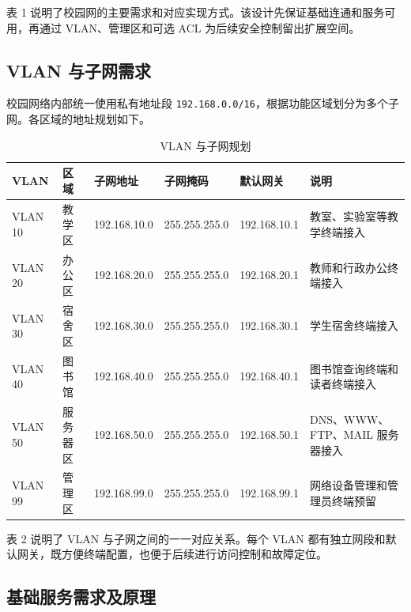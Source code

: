 \documentclass[UTF8,a4paper]{ctexart}
\begin{document}
表 1 说明了校园网的主要需求和对应实现方式。该设计先保证基础连通和服务可用，再通过 VLAN、管理区和可选 ACL 为后续安全控制留出扩展空间。

\subsection{VLAN 与子网需求}

校园网络内部统一使用私有地址段 \texttt{192.168.0.0/16}，根据功能区域划分为多个子网。各区域的地址规划如下。

\begin{table}[H]
\centering
\caption{VLAN 与子网规划}
\begin{tabularx}{\textwidth}{p{1.7cm}p{1.8cm}p{2.5cm}p{2.5cm}p{2.4cm}Y}
\toprule
VLAN & 区域 & 子网地址 & 子网掩码 & 默认网关 & 说明 \\
\midrule
VLAN 10 & 教学区 & 192.168.10.0 & 255.255.255.0 & 192.168.10.1 & 教室、实验室等教学终端接入 \\
VLAN 20 & 办公区 & 192.168.20.0 & 255.255.255.0 & 192.168.20.1 & 教师和行政办公终端接入 \\
VLAN 30 & 宿舍区 & 192.168.30.0 & 255.255.255.0 & 192.168.30.1 & 学生宿舍终端接入 \\
VLAN 40 & 图书馆 & 192.168.40.0 & 255.255.255.0 & 192.168.40.1 & 图书馆查询终端和读者终端接入 \\
VLAN 50 & 服务器区 & 192.168.50.0 & 255.255.255.0 & 192.168.50.1 & DNS、WWW、FTP、MAIL 服务器接入 \\
VLAN 99 & 管理区 & 192.168.99.0 & 255.255.255.0 & 192.168.99.1 & 网络设备管理和管理员终端预留 \\
\bottomrule
\end{tabularx}
\end{table}

表 2 说明了 VLAN 与子网之间的一一对应关系。每个 VLAN 都有独立网段和默认网关，既方便终端配置，也便于后续进行访问控制和故障定位。

\subsection{基础服务需求及原理}
\end{document}

